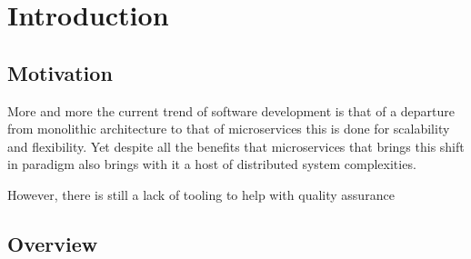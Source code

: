 \chapter{\centering Introduction}

\section{Motivation}
More and more the current trend of software development is that of a departure 
from monolithic architecture to that of microservices this is done for scalability 
and flexibility. Yet despite all the benefits that microservices that brings
this shift in paradigm also brings with it a host of distributed system complexities.

However, there is still a lack of tooling to help with quality assurance

\section{Overview}
